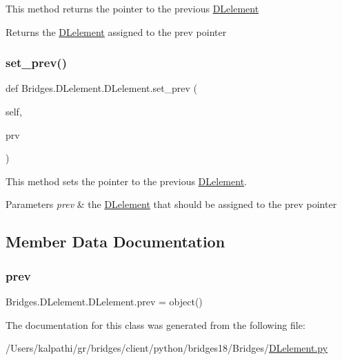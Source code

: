 This method returns the pointer to the previous \mbox{\hyperlink{class_bridges_1_1_d_lelement_1_1_d_lelement}{D\+Lelement}}

\begin{DoxyReturn}{Returns}
the \mbox{\hyperlink{class_bridges_1_1_d_lelement_1_1_d_lelement}{D\+Lelement}} assigned to the prev pointer 
\end{DoxyReturn}
\mbox{\label{class_bridges_1_1_d_lelement_1_1_d_lelement_a34acbe81af0c0c90640383363fe0aadc}} 
\subsubsection{\texorpdfstring{set\+\_\+prev()}{set\_prev()}}
{\footnotesize\ttfamily def Bridges.\+D\+Lelement.\+D\+Lelement.\+set\+\_\+prev (\begin{DoxyParamCaption}\item[{}]{self,  }\item[{}]{prv }\end{DoxyParamCaption})}



This method sets the pointer to the previous \mbox{\hyperlink{class_bridges_1_1_d_lelement_1_1_d_lelement}{D\+Lelement}}. 


\begin{DoxyParams}{Parameters}
{\em prev} & the \mbox{\hyperlink{class_bridges_1_1_d_lelement_1_1_d_lelement}{D\+Lelement}} that should be assigned to the prev pointer \\
\hline
\end{DoxyParams}


\subsection{Member Data Documentation}
\mbox{\label{class_bridges_1_1_d_lelement_1_1_d_lelement_a08e7ba4d3ea7b49409b470752ca75ad1}} 
\subsubsection{\texorpdfstring{prev}{prev}}
{\footnotesize\ttfamily Bridges.\+D\+Lelement.\+D\+Lelement.\+prev = object()\hspace{0.3cm}{\ttfamily [static]}}



The documentation for this class was generated from the following file\+:\begin{DoxyCompactItemize}
\item 
/\+Users/kalpathi/gr/bridges/client/python/bridges18/\+Bridges/\mbox{\hyperlink{_d_lelement_8py}{D\+Lelement.\+py}}\end{DoxyCompactItemize}
